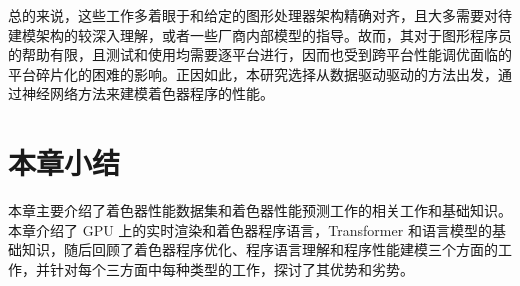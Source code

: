 



总的来说，这些工作多着眼于和给定的图形处理器架构精确对齐，且大多需要对待建模架构的较深入理解，或者一些厂商内部模型的指导。故而，其对于图形程序员的帮助有限，且测试和使用均需要逐平台进行，因而也受到跨平台性能调优面临的平台碎片化的困难的影响。正因如此，本研究选择从数据驱动驱动的方法出发，通过神经网络方法来建模着色器程序的性能。


\section{{\added 本章小结}}

{\added 本章主要介绍了着色器性能数据集和着色器性能预测工作的相关工作和基础知识。本章介绍了 GPU 上的实时渲染和着色器程序语言，Transformer 和语言模型的基础知识，随后回顾了着色器程序优化、程序语言理解和程序性能建模三个方面的工作，并针对每个三方面中每种类型的工作，探讨了其优势和劣势。}